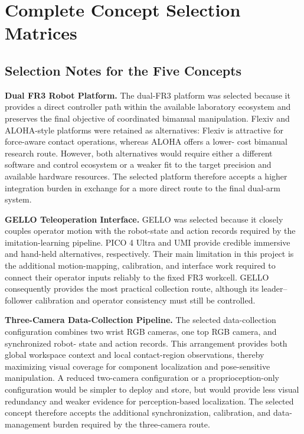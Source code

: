 \documentclass[12pt, letterpaper]{article}
\begin{document}
\section{Complete Concept Selection Matrices}

 \subsection{Selection Notes for the Five Concepts}

  \noindent\textbf{Dual FR3 Robot Platform.}
  The dual-FR3 platform was selected because it provides a direct controller path within the available laboratory
  ecosystem and preserves the final objective of coordinated bimanual manipulation. Flexiv and ALOHA-style platforms
  were retained as alternatives: Flexiv is attractive for force-aware contact operations, whereas ALOHA offers a lower-
  cost bimanual research route. However, both alternatives would require either a different software and control
  ecosystem or a weaker fit to the target precision and available hardware resources. The selected platform therefore
  accepts a higher integration burden in exchange for a more direct route to the final dual-arm system.

  \noindent\textbf{GELLO Teleoperation Interface.}
  GELLO was selected because it closely couples operator motion with the robot-state and action records required by the
  imitation-learning pipeline. PICO 4 Ultra and UMI provide credible immersive and hand-held alternatives, respectively.
  Their main limitation in this project is the additional motion-mapping, calibration, and interface work required to
  connect their operator inputs reliably to the fixed FR3 workcell. GELLO consequently provides the most practical
  collection route, although its leader--follower calibration and operator consistency must still be controlled.

  \noindent\textbf{Three-Camera Data-Collection Pipeline.}
  The selected data-collection configuration combines two wrist RGB cameras, one top RGB camera, and synchronized robot-
  state and action records. This arrangement provides both global workspace context and local contact-region
  observations, thereby maximizing visual coverage for component localization and pose-sensitive manipulation. A reduced
  two-camera configuration or a proprioception-only configuration would be simpler to deploy and store, but would
  provide less visual redundancy and weaker evidence for perception-based localization. The selected concept therefore
  accepts the additional synchronization, calibration, and data-management burden required by the three-camera route.
\end{document}
